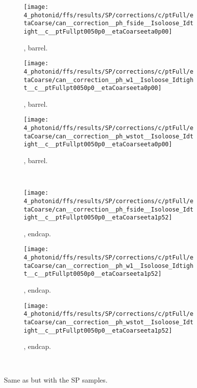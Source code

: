 \begin{figure}[ht!]
    \centering
    \begin{subfigure}[h]{0.32\linewidth}
        \centering
        \texttt{[image: 4\_photonid/ffs/results/SP/corrections/c/ptFull/etaCoarse/can\_\_correction\_\_ph\_fside\_\_Isoloose\_Idtight\_\_c\_\_ptFullpt0050p0\_\_etaCoarseeta0p00]}
        \caption{\fside, barrel.}
    \end{subfigure}
    \hfill
    \begin{subfigure}[h]{0.32\linewidth}
        \centering
        \texttt{[image: 4\_photonid/ffs/results/SP/corrections/c/ptFull/etaCoarse/can\_\_correction\_\_ph\_w1\_\_Isoloose\_Idtight\_\_c\_\_ptFullpt0050p0\_\_etaCoarseeta0p00]}
        \caption{\wone, barrel.}
    \end{subfigure}
    \hfill
    \begin{subfigure}[h]{0.32\linewidth}
        \centering
        \texttt{[image: 4\_photonid/ffs/results/SP/corrections/c/ptFull/etaCoarse/can\_\_correction\_\_ph\_wstot\_\_Isoloose\_Idtight\_\_c\_\_ptFullpt0050p0\_\_etaCoarseeta0p00]}
        \caption{\wstot, barrel.}
    \end{subfigure}\\
    \begin{subfigure}[h]{0.32\linewidth}
        \centering
        \texttt{[image: 4\_photonid/ffs/results/SP/corrections/c/ptFull/etaCoarse/can\_\_correction\_\_ph\_fside\_\_Isoloose\_Idtight\_\_c\_\_ptFullpt0050p0\_\_etaCoarseeta1p52]}
        \caption{\fside, endcap.}
    \end{subfigure}
    \hfill
    \begin{subfigure}[h]{0.32\linewidth}
        \centering
        \texttt{[image: 4\_photonid/ffs/results/SP/corrections/c/ptFull/etaCoarse/can\_\_correction\_\_ph\_w1\_\_Isoloose\_Idtight\_\_c\_\_ptFullpt0050p0\_\_etaCoarseeta1p52]}
        \caption{\wone, endcap.}
    \end{subfigure}
    \hfill
    \begin{subfigure}[h]{0.32\linewidth}
        \centering
        \texttt{[image: 4\_photonid/ffs/results/SP/corrections/c/ptFull/etaCoarse/can\_\_correction\_\_ph\_wstot\_\_Isoloose\_Idtight\_\_c\_\_ptFullpt0050p0\_\_etaCoarseeta1p52]}
        \caption{\wstot, endcap.}
    \end{subfigure}\\
    \caption{Same as \Fig{\ref{fig:ss_corrections:ffs:results:ss_rz}} but with the \ac{SP} samples.}
    \label{fig:ss_corrections:ffs:results:ss_sp}
\end{figure}
























